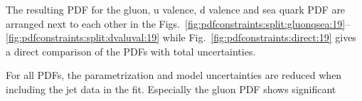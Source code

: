 The resulting PDF for the gluon, u valence, d valence and sea quark PDF are
arranged next to each other in the
Figs.~\ref{fig:pdfconstraints:split:gluonqsea:19}--\ref{fig:pdfconstraints:split:dvaluval:19}
while Fig.~\ref{fig:pdfconstraints:direct:19} gives a direct comparison of the
PDFs with total uncertainties. 

For all PDFs, the parametrization and model uncertainties are reduced when
including the jet data in the fit. Especially the gluon PDF shows significant

%

